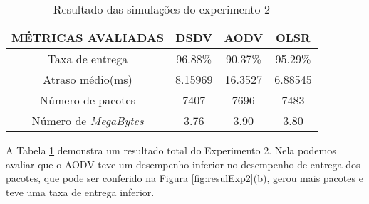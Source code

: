 \begin{table}[H]
	\centering
	\caption{Resultado das simula\c{c}\~oes do experimento 2}
	\begin{tabular}{ | c | c | c | c | }
		\hline
		M\'ETRICAS AVALIADAS & DSDV & AODV & OLSR \\ \hline
		Taxa de entrega & 96.88\% & 90.37\% & 95.29\%  \\ \hline
		Atraso m\'edio(ms) & 8.15969 & 16.3527 & 6.88545  \\ \hline
		N\'umero de pacotes & 7407 & 7696 & 7483  \\ \hline
		N\'umero de \textit{MegaBytes} & 3.76 & 3.90 & 3.80  \\ \hline
	\end{tabular}
	\label{tabExp2Result}
\end{table}

A Tabela \ref{tabExp2Result} demonstra um resultado total do Experimento 2. Nela podemos avaliar que o AODV teve um desempenho inferior no desempenho de entrega dos pacotes, que pode ser conferido na Figura \ref{fig:resulExp2}(b), gerou mais pacotes e teve uma taxa de entrega inferior.
